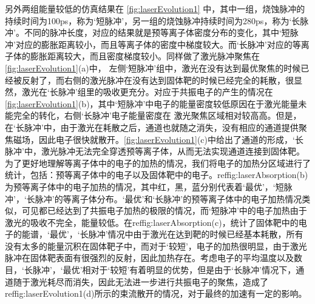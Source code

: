 另外两组能量较低的仿真结果在 \ref{fig:laserEvolution1} 中，其中一组，烧蚀脉冲的持续时间为100ps，称为‘短脉冲’，另一组的烧蚀脉冲持续时间为280ps，称为‘长脉冲’。不同的脉冲长度，对应的结果就是预等离子体密度分布的变化，其中‘短脉冲’对应的膨胀距离较小，而且等离子体的密度中梯度较大。而‘长脉冲’对应的等离子体的膨胀距离较大，而且密度梯度较小。同样做了激光脉冲聚焦在\ref{fig:laserEvolution1}(a)中， 左侧‘短脉冲’组中，激光在没有达到最优聚焦的时候已经被反射了，而右侧的激光脉冲在没有达到固体靶的时候已经完全的耗散，很显然，激光在‘长脉冲’组里的吸收更充分。对应于共振电子的产生的情况在\ref{fig:laserEvolution1}(b)，其中‘短脉冲’中电子的能量密度较低原因在于激光能量未能完全的转化，右侧‘长脉冲’电子能量密度在 激光聚焦区域相对较高高。但是， 在‘长脉冲’中，由于激光在耗散之后，通道也就随之消失，没有相应的通道提供聚焦磁场，因此电子很快就散开。\ref{fig:laserEvolution1}(c)中给出了通道的形成，‘长脉冲’中，激光脉冲无法完全穿透预等离子体，从而无法实现通道连接到固体靶。 为了更好地理解等离子体中的电子的加热的情况，我们将电子的加热分区域进行了统计，包括：预等离子体中的电子以及固体靶中的电子。ref{fig:laserAbsorption}(b)为预等离子体中的电子加热的情况，其中红，黑，蓝分别代表着‘最优’，‘短脉冲’，‘长脉冲’的等离子体分布。‘最优’和‘长脉冲’的预等离子体中的电子加热情况类似，可见都已经达到了共振电子加热的极限的情况，而‘短脉冲’中的电子加热由于激光的吸收不完全，能量较低。在ref{fig:laserAbsorption}(c)，统计了固体靶中的电子的能谱，‘最优’，‘长脉冲’情况中由于激光在达到靶的时候已经基本耗散，所有没有太多的能量沉积在固体靶子中，而对于‘较短’，电子的加热很明显，由于激光脉冲在固体靶表面有很强烈的反射，因此加热存在。考虑电子的平均温度以及数目，‘长脉冲’，‘最优’相对于‘较短’有着明显的优势，但是由于‘长脉冲’情况下，通道随于激光耗尽而消失，因此无法进一步进行共振电子的聚焦，造成了ref{fig:laserEvolution1}(d)所示的束流散开的情况，对于最终的加速有一定的影响。


